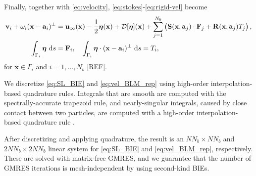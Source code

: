 \documentclass[prb,preprint,showpacs,preprintnumbers,amsmath,amssymb,longbibliography]{revtex4-1}
\renewcommand{\aa}{\mathbf{a}}
\newcommand{\DD}{\mathcal{D}}
\newcommand{\eeta}{\boldsymbol{\eta}}
\newcommand{\FF}{\mathbf{F}}
\newcommand{\RR}{\mathbf{R}}
\renewcommand{\SS}{\mathbf{S}}
\newcommand{\xx}{\mathbf{x}}
\newcommand{\uu}{\mathbf{u}}
\renewcommand{\vv}{\mathbf{v}}
\begin{document}
Finally, together with \eqref{eq:velocity},
\eqref{eq:stokes}-\eqref{eq:rigid-vel} become 
\begin{alignat}{3}
  \label{eq:vel_BLM_rep}
  \vv_i + \omega_i (\xx - \aa_i)^\perp &= \uu_\infty(\xx)
    -\frac{1}{2} \eeta(\xx) + \DD[\eeta](\xx) 
    + \sum_{j=1}^{N_b} 
    \left(\SS(\xx,\aa_j) \cdot \FF_j + \RR(\xx,\aa_j) T_j\right),\\
  \label{eq:mobility}
  \int_{\Gamma_i} \eeta \, \dif s &= \mathbf{F}_i, \quad
  \int_{\Gamma_i} \eeta \cdot (\xx-\aa_i)^\perp \, \dif s = T_i,
\end{alignat}
for $\xx \in \Gamma_i$ and $i = 1,\dots,N_b$ [REF].

We discretize \eqref{eq:SL_BIE} and \eqref{eq:vel_BLM_rep}
using high-order interpolation-based quadrature rules.
Integrals that are smooth are computed with
the spectrally-accurate trapezoid rule, and nearly-singular integrals,
caused by close contact between two particles, are computed with a
high-order interpolation-based quadrature rule \cite{qua-bir2014}.

After discretizing and applying quadrature,
the result is an $NN_b \times NN_b$ and $2NN_b \times 2NN_b$
linear system for \eqref{eq:SL_BIE} and \eqref{eq:vel_BLM_rep}, respectively.
These are solved with matrix-free GMRES, and we guarantee that the number of
GMRES iterations is mesh-independent by using second-kind BIEs.

\end{document}

